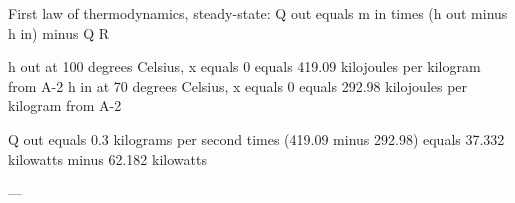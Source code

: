 First law of thermodynamics, steady-state:  
Q out equals m in times (h out minus h in) minus Q R  

h out at 100 degrees Celsius, x equals 0 equals 419.09 kilojoules per kilogram from A-2  
h in at 70 degrees Celsius, x equals 0 equals 292.98 kilojoules per kilogram from A-2  

Q out equals 0.3 kilograms per second times (419.09 minus 292.98) equals 37.332 kilowatts minus 62.182 kilowatts  

---
